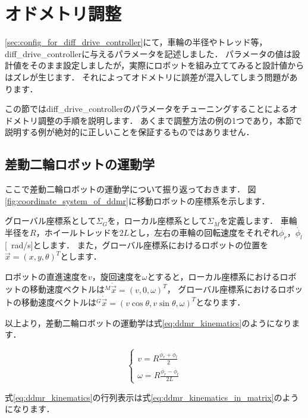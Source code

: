 \documentclass[{../../master}]{subfiles}
\begin{document}
\section{オドメトリ調整}

\ref{sec:config_for_diff_drive_controller}にて，車輪の半径やトレッド等，\textsf{diff\_drive\_controller}に与えるパラメータを記述しました．
パラメータの値は設計値をそのまま設定しましたが，実際にロボットを組み立ててみると設計値からはズレが生じます．
それによってオドメトリに誤差が混入してしまう問題があります．

この節では\textsf{diff\_drive\_controller}のパラメータをチューニングすることによるオドメトリ調整の手順を説明します．
あくまで調整方法の例の1つであり，本節で説明する例が絶対的に正しいことを保証するものではありません．

\subsection{差動二輪ロボットの運動学}

ここで差動二輪ロボットの運動学について振り返っておきます．
図\ref{fig:coordinate_system_of_ddmr}に移動ロボットの座標系を示します．

グローバル座標系として$\Sigma_{G}$を，ローカル座標系として$\Sigma_{M}$を定義します．
車輪半径を$R$，ホイールトレッドを$2L$とし，左右の車輪の回転速度をそれぞれ$\dot{\phi_{r}}$，$\dot{\phi_{l}}$[\SI{}{rad/s}]とします．
また，グローバル座標系におけるロボットの位置を$\vec{x} = (x, y, \theta)^T$とします．

ロボットの直進速度を$v$，旋回速度を$\omega$とすると，ローカル座標系におけるロボットの移動速度ベクトルは${}^{M}\dot{\vec{x}} = (v, 0, \omega)^T$，
グローバル座標系におけるロボットの移動速度ベクトルは${}^{G}\dot{\vec{x}} = (v\cos{\theta}, v\sin{\theta}, \omega)^T$となります．

以上より，差動二輪ロボットの運動学は式\ref{eq:ddmr_kinematics}のようになります．

\begin{equation}
  \begin{cases}
    v = R \frac{\dot{\phi_{r}} + \dot{\phi_{l}}}{2} \\
    \omega = R \frac{\dot{\phi_{r}} - \dot{\phi_{l}}}{2L}
  \end{cases}
  \label{eq:ddmr_kinematics}
\end{equation}

\noindent
式\ref{eq:ddmr_kinematics}の行列表示は式\ref{eq:ddmr_kinematics_in_matrix}のようになります．
\end{document}
